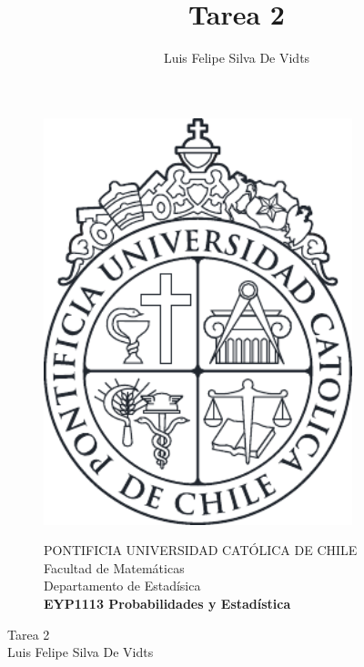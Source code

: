 \documentclass{article}
\title{Tarea 2\\}
\author{Luis Felipe Silva De Vidts}
\begin{document}
\begin{figure}
\begin{minipage}{2.5cm}
\includegraphics[width=0.8\textwidth]{./figures/LogoUC-BN}
\end{minipage}
\begin{minipage}{14.5cm}
\vspace{4mm}
{\sc PONTIFICIA UNIVERSIDAD CAT\'OLICA DE CHILE}\\
Facultad de Matemáticas\\
Departamento de Estadísica\\
{\bf EYP1113 Probabilidades y Estadística}\\
\vspace{0mm}
\hrulefill
\end{minipage}
\end{figure}
\phantom{""}
\vspace{-5mm}
\normalsize
\begin{center}
\Huge Tarea 2\\
\normalsize Luis Felipe Silva De Vidts
\end{center}
\end{document}
